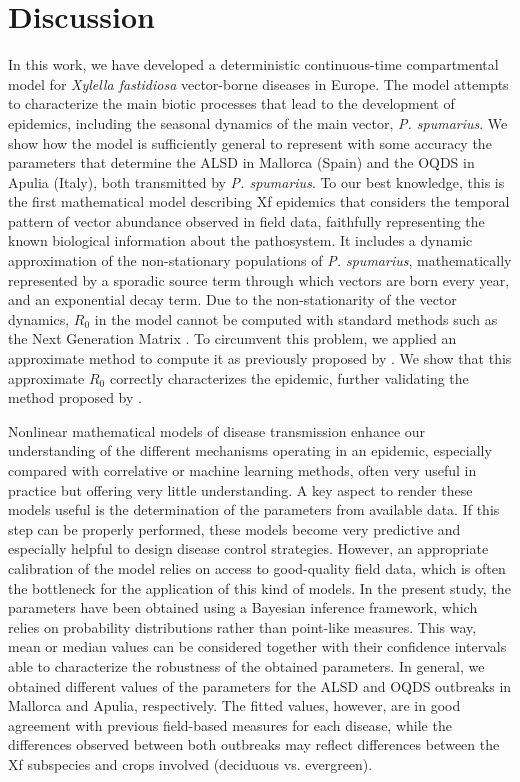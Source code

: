 \section{Discussion}

In this work, we have developed a deterministic continuous-time
compartmental model for \textit{Xylella fastidiosa} vector-borne diseases in
Europe. The model attempts to characterize the main biotic processes that lead
to the development of epidemics, including the seasonal dynamics of the main
vector, \textit{P. spumarius}. We show how the model is sufficiently general to
represent with some accuracy the parameters that determine the ALSD in Mallorca
(Spain) and the OQDS in Apulia (Italy), both transmitted by \textit{P.
    spumarius}. To our best knowledge, this is the first mathematical model
describing Xf epidemics that considers the temporal pattern of vector abundance
observed in field data, faithfully representing the known biological
information about the pathosystem. It includes a dynamic approximation of the
non-stationary populations of \textit{P. spumarius}, mathematically represented
by a sporadic source term through which vectors are born every year, and an
exponential decay term. Due to the non-stationarity of the vector dynamics,
$R_0$ in the model cannot be computed with standard methods such as the Next
Generation Matrix \cite{Diekmann2010}. To circumvent this problem, we applied
an approximate method to compute it as previously proposed by
\cite{GimenezRomero2022_PRE}. We show that this approximate $R_0$ correctly
characterizes the epidemic, further validating the method proposed by
\cite{GimenezRomero2022_PRE}.

Nonlinear mathematical models of disease transmission enhance our
understanding of the different mechanisms operating in an epidemic, especially
compared with correlative or machine learning methods, often very useful in
practice but offering very little understanding. A key aspect to render these
models useful is the determination of the parameters from available data. If
this step can be properly performed, these models become very predictive and
especially helpful to design disease control strategies. However, an
appropriate calibration of the model relies on access to good-quality field
data, which is often the bottleneck for the application of this kind of models.
In the present study, the parameters have been obtained using a Bayesian
inference framework, which relies on probability distributions rather than
point-like measures. This way, mean or median values can be considered together
with their confidence intervals able to characterize the robustness of the
obtained parameters. In general, we obtained different values of the parameters
for the ALSD and OQDS outbreaks in Mallorca and Apulia, respectively. The
fitted values, however, are in good agreement with previous field-based
measures for each disease, while the differences observed between both
outbreaks may reflect differences between the Xf subspecies and crops involved
(deciduous vs. evergreen).

